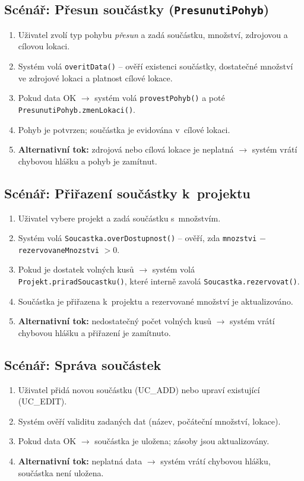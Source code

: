 \subsection*{Scénář: Přesun součástky (\texttt{PresunutiPohyb})}
\begin{enumerate}
  \item Uživatel zvolí typ pohybu \emph{přesun} a zadá součástku, množství, zdrojovou a cílovou lokaci.
  \item Systém volá \texttt{overitData()} -- ověří existenci součástky, dostatečné množství ve zdrojové lokaci a platnost cílové lokace.
  \item Pokud data OK $\rightarrow$ systém volá \texttt{provestPohyb()} a poté \texttt{PresunutiPohyb.zmenLokaci()}.
  \item Pohyb je potvrzen; součástka je evidována v~cílové lokaci.
  \item \textbf{Alternativní tok:} zdrojová nebo cílová lokace je neplatná $\rightarrow$ systém vrátí chybovou hlášku a pohyb je zamítnut.
\end{enumerate}

\subsection*{Scénář: Přiřazení součástky k~projektu}
\begin{enumerate}
  \item Uživatel vybere projekt a zadá součástku s~množstvím.
  \item Systém volá \texttt{Soucastka.overDostupnost()} -- ověří, zda \texttt{mnozstvi} $-$ \texttt{rezervovaneMnozstvi} $> 0$.
  \item Pokud je dostatek volných kusů $\rightarrow$ systém volá \texttt{Projekt.priradSoucastku()}, které interně zavolá \texttt{Soucastka.rezervovat()}.
  \item Součástka je přiřazena k~projektu a rezervované množství je aktualizováno.
  \item \textbf{Alternativní tok:} nedostatečný počet volných kusů $\rightarrow$ systém vrátí chybovou hlášku a přiřazení je zamítnuto.
\end{enumerate}

\subsection*{Scénář: Správa součástek}
\begin{enumerate}
  \item Uživatel přidá novou součástku (UC\_ADD) nebo upraví existující (UC\_EDIT).
  \item Systém ověří validitu zadaných dat (název, počáteční množství, lokace).
  \item Pokud data OK $\rightarrow$ součástka je uložena; zásoby jsou aktualizovány.
  \item \textbf{Alternativní tok:} neplatná data $\rightarrow$ systém vrátí chybovou hlášku, součástka není uložena.
\end{enumerate}
